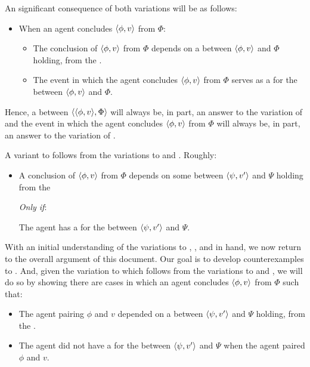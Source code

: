 \begin{note}
  An significant consequence of both variations will be as follows:

  \begin{itemize}
  \item
    When an agent concludes \(\langle \phi, v \rangle\) from \(\Phi\):
    \begin{itemize}
    \item The \agents{} conclusion of \(\langle \phi, v \rangle\) from \(\Phi\) depends on a  between \(\langle \phi, v \rangle\) and \(\Phi\) holding, from the \agpe{}.
    \item The event in which the agent concludes \(\langle \phi, v \rangle\) from \(\Phi\) serves as a  for the  between \(\langle \phi, v \rangle\) and \(\Phi\).
    \end{itemize}
  \end{itemize}
  Hence, a \ros{} between \(\langle \langle \phi, v \rangle, \Phi \rangle\) will always be, in part, an answer to the variation of \qWhy{} and the event in which the agent concludes \(\langle \phi, v \rangle\) from \(\Phi\) will always be, in part, an answer to the variation of \qHow{}.
\end{note}

\begin{note}
  A variant to \issueInclusion{} follows from the variations to \qWhy{} and \qHow{}.
  Roughly:

  \begin{itemize}
  \item
    A conclusion of \(\langle \phi, v \rangle\) from \(\Phi\) depends on some \ros{} between \(\langle \psi, v' \rangle\) and \(\Psi\) holding from the \agpe{}

    \emph{Only if}:

    The agent has a \wit{} for the  between \(\langle \psi, v' \rangle\) and \(\Psi\).
  \end{itemize}
\end{note}

\begin{note}
  With an initial understanding of the variations to \qWhy{}, \qHow{}, and \issueInclusion{} in hand, we now return to the overall argument of this document.
  Our goal is to develop counterexamples to \issueInclusion{}.
  And, given the variation to \issueInclusion{} which follows from the variations to \qWhy{} and \qHow{}, we will do so by showing there are cases in which an agent concludes \(\langle \phi, v \rangle\) from \(\Phi\) such that:
  \begin{itemize}
  \item
    The agent pairing \(\phi\) and \(v\) depended on a  between \(\langle \psi, v' \rangle\) and \(\Psi\) holding, from the \agpe{}.
  \item
    The agent did not have a  for the  between \(\langle \psi, v' \rangle\) and \(\Psi\) when the agent paired \(\phi\) and \(v\).
  \end{itemize}
\end{note}

